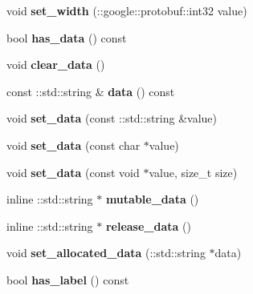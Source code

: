 \begin{DoxyCompactItemize}
void {\bfseries set\+\_\+width} (\+::google\+::protobuf\+::int32 value)
\item 
\mbox{\label{classcaffe_1_1_datum_a300124e89cabba6af94b86dbe0db304c}} 
bool {\bfseries has\+\_\+data} () const
\item 
\mbox{\label{classcaffe_1_1_datum_ae08f58a051fa2bcf7d002c8bbec3d993}} 
void {\bfseries clear\+\_\+data} ()
\item 
\mbox{\label{classcaffe_1_1_datum_ae55b6b5e45b96f38f7e6cda8b73116ab}} 
const \+::std\+::string \& {\bfseries data} () const
\item 
\mbox{\label{classcaffe_1_1_datum_a552eb07ebf6502b7b6ab5ccb3a1a0449}} 
void {\bfseries set\+\_\+data} (const \+::std\+::string \&value)
\item 
\mbox{\label{classcaffe_1_1_datum_a8186e25515b68160abc98584cc2a722d}} 
void {\bfseries set\+\_\+data} (const char $\ast$value)
\item 
\mbox{\label{classcaffe_1_1_datum_a8d04604fbd13a265580d28b742e384b3}} 
void {\bfseries set\+\_\+data} (const void $\ast$value, size\+\_\+t size)
\item 
\mbox{\label{classcaffe_1_1_datum_a75d46da4310d46ad6cf3e3badd79a61b}} 
inline \+::std\+::string $\ast$ {\bfseries mutable\+\_\+data} ()
\item 
\mbox{\label{classcaffe_1_1_datum_a9e94c7d588d6a477936b48321cd965a3}} 
inline \+::std\+::string $\ast$ {\bfseries release\+\_\+data} ()
\item 
\mbox{\label{classcaffe_1_1_datum_ad0da0841a54b5cde90b76c2dee977df5}} 
void {\bfseries set\+\_\+allocated\+\_\+data} (\+::std\+::string $\ast$data)
\item 
\mbox{\label{classcaffe_1_1_datum_a0406531bf13d4b49cb4eac1492b9931a}} 
bool {\bfseries has\+\_\+label} () const
\item 
\mbox{\label{classcaffe_1_1_datum_a57debbf6b3293bfb226b9218f06401b7}} 

\end{DoxyCompactItemize}
